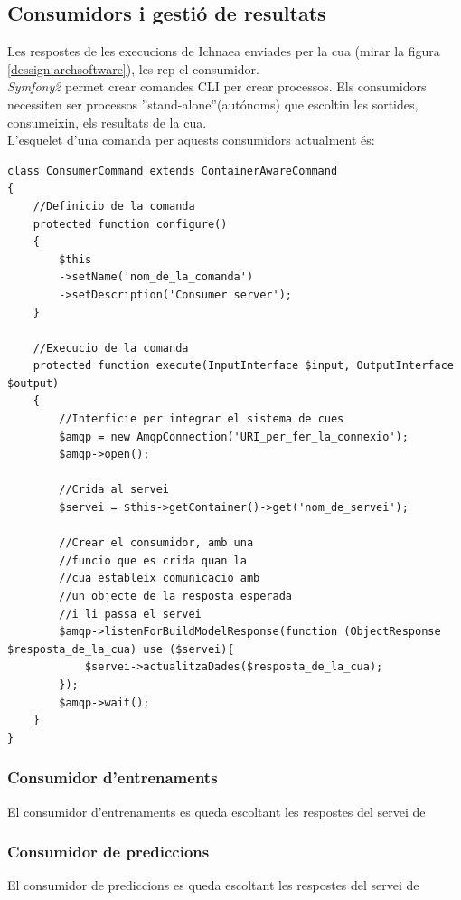 \subsection{Consumidors i gesti\'{o} de resultats}
Les respostes de les execucions de Ichnaea enviades per la cua (mirar la figura \ref{dessign:archsoftware}), les rep el consumidor. \\
\textit{Symfony2} permet crear comandes CLI per crear processos. Els consumidors necessiten ser processos ''stand-alone''(aut\'{o}noms) que escoltin les sortides, consumeixin, els resultats de la cua. \\
L'esquelet d'una comanda per aquests consumidors actualment \'{e}s:
\begin{lstlisting}
class ConsumerCommand extends ContainerAwareCommand
{
	//Definicio de la comanda
	protected function configure()
	{
		$this
		->setName('nom_de_la_comanda')
		->setDescription('Consumer server');
	}
	
	//Execucio de la comanda
	protected function execute(InputInterface $input, OutputInterface $output)
	{
		//Interficie per integrar el sistema de cues
		$amqp = new AmqpConnection('URI_per_fer_la_connexio');
		$amqp->open();
		
		//Crida al servei
		$servei = $this->getContainer()->get('nom_de_servei');
		
		//Crear el consumidor, amb una 
		//funcio que es crida quan la 
		//cua estableix comunicacio amb 
		//un objecte de la resposta esperada 
		//i li passa el servei 
		$amqp->listenForBuildModelResponse(function (ObjectResponse $resposta_de_la_cua) use ($servei){
			$servei->actualitzaDades($resposta_de_la_cua);
		});
		$amqp->wait();
	}
}
\end{lstlisting}

\subsubsection{Consumidor d'entrenaments}
El consumidor d'entrenaments es queda escoltant les respostes del servei de \\

\subsubsection{Consumidor de prediccions}
El consumidor de prediccions es queda escoltant les respostes del servei de \\


